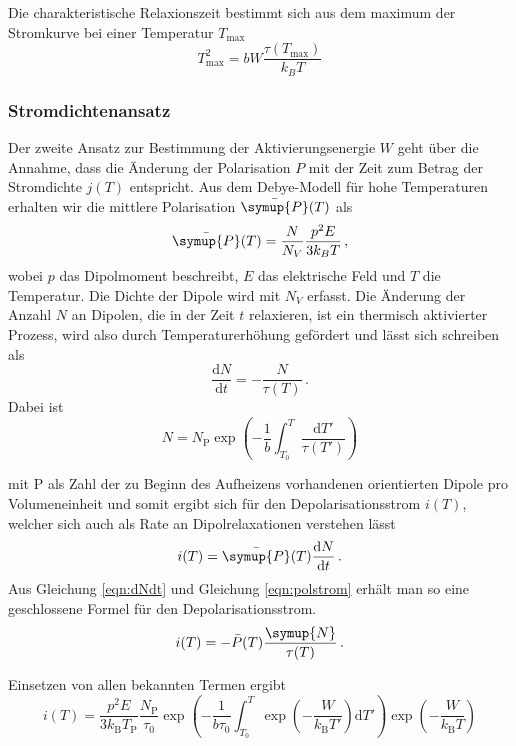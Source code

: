 Die charakteristische Relaxionszeit bestimmt sich aus dem maximum der Stromkurve bei einer Temperatur $T_{\text{max}}$
\begin{equation}
    T^2_{\text{max}} = bW\frac{\tau (T_{\text{max}})}{k_B T}
\end{equation}


\subsubsection{Stromdichtenansatz}
Der zweite Ansatz zur Bestimmung der Aktivierungsenergie $W$ geht über die Annahme,
dass die Änderung der Polarisation $P$ mit der Zeit zum Betrag der Stromdichte $j(T)$
entspricht.
Aus dem Debye-Modell für hohe Temperaturen erhalten wir die mittlere Polarisation $\bar{\symup{P}}(T)$ als
\begin{equation}
    \bar{\symup{P}}(T) = \frac{N}{N_V}\frac{p^2 E}{3k_B T}\,,
\end{equation}
wobei $p$ das Dipolmoment beschreibt, 
$E$ das elektrische Feld und $T$ die Temperatur.
Die Dichte der Dipole wird mit $N_V$ erfasst.
Die Änderung der Anzahl $N$ an Dipolen, 
die in der Zeit $t$ relaxieren, 
ist ein thermisch aktivierter Prozess,
wird also durch Temperaturerhöhung gefördert und lässt sich schreiben als
\begin{equation}
    \frac{\text{d}{N}}{\text{d}{t}} = -\frac{N}{\tau(T)}\,.
    \label{eqn:dNdt}
\end{equation}
Dabei ist
\begin{equation*}
    N = N_\mathrm{P} \exp\!\left( -\frac{1}{b} \int_{T_0}^T
      \frac{\text{d}{T'}}{\tau(T')} \right)
    \label{eqn:anzahlDipole}
\end{equation*}

mit $\mathrm{P}$ als Zahl der zu Beginn des Aufheizens vorhandenen orientierten Dipole pro Volumeneinheit
und somit ergibt sich für den Depolarisationsstrom $i(T)$, welcher sich auch als Rate an Dipolrelaxationen verstehen lässt
\begin{equation}
    i(T) = \bar{\symup{P}}(T) \frac{\text{d}{N}}{\text{d}{t}}\,.
    \label{eqn:polstrom}
\end{equation}
Aus Gleichung \eqref{eqn:dNdt} und Gleichung \eqref{eqn:polstrom} erhält man so eine geschlossene Formel für den Depolarisationsstrom.
\begin{equation}
    i(T) = -\bar{P}(T) \frac{\symup{N}}{\tau(T)}\,.
\end{equation}

Einsetzen von allen bekannten Termen ergibt
\begin{equation}
    i(T) = \frac{ p^2 E }{ 3 k_\mathrm{B} T_\mathrm{P} } \frac{ N_\mathrm{P} }{ \tau_0 } \exp{ \left( - \frac{ 1 }{ b \tau_0 }
    \int_{T_0}^T \exp{ \left( - \frac{ W }{ k_\mathrm{B} T' } \right) \mathrm{d}T' } \right) } \exp{
    \left( -\frac{ W }{ k_\mathrm{B} T } \right) }
    \label{eqn:i_t}
\end{equation}